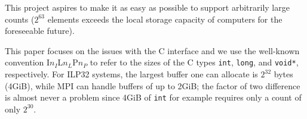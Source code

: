 This project aspires to make it as easy as possible to support arbitrarily
large counts ($2^{63}$ elements exceeds the local storage capacity of computers
for the foreseeable future).



This paper focuses on the issues with the C interface and we use the
well-known convention I$n_{I}$L$n_{L}$P$n_{P}$ to refer to the sizes
of the C types \texttt{int}, \texttt{long}, and \texttt{void*}, respectively.
For ILP32 systems, the largest buffer one can allocate is $2^{32}$ bytes (4GiB),
while MPI can handle buffers of up to 2GiB; the factor of two difference is
almost never a problem since 4GiB of \texttt{int} for example requires only
a count of only $2^{30}$.



